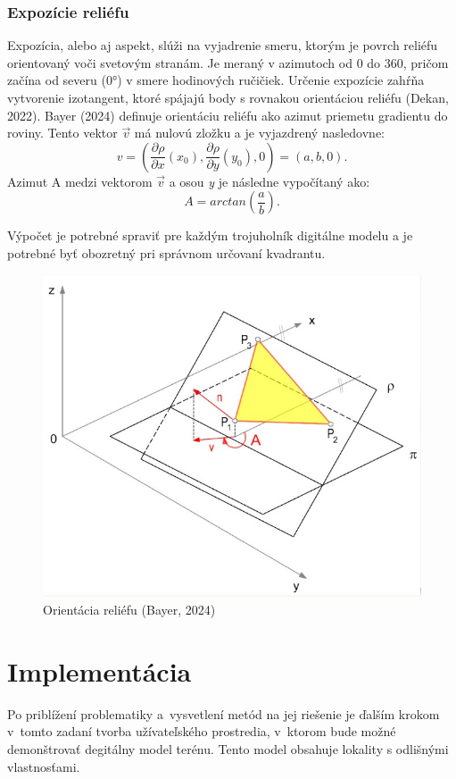 \documentclass[12pt]{article}
\begin{document}
\subsubsection*{Expozície reliéfu}
Expozícia, alebo aj aspekt, slúži na vyjadrenie smeru, ktorým je povrch reliéfu orientovaný voči svetovým stranám. Je meraný v azimutoch od 0 do 360, pričom začína od severu (0°) v smere hodinových ručičiek. Určenie expozície zahŕňa vytvorenie izotangent, ktoré spájajú body s rovnakou orientáciou reliéfu (Dekan, 2022).
Bayer (2024) definuje orientáciu reliéfu ako azimut priemetu gradientu do roviny. Tento vektor $\vec{v}$ má nulovú zložku a je vyjazdrený nasledovne:
$$v = (\frac{\partial \rho }{ \partial x}(x_0), \frac{\partial \rho }{ \partial y}(y_0),0)=(a, b, 0).$$
Azimut A medzi vektorom $\vec{v}$ a osou \textit{y} je následne vypočítaný ako:
$$ A = arctan (\frac{a}{b}). $$ \par
Výpočet je potrebné spraviť pre každým trojuholník digitálne modelu a je potrebné byť obozretný pri správnom určovaní kvadrantu.
\newpage

\begin{figure}[h]
    \centering
    \includegraphics[width=0.8\linewidth]{latex/images/aspekt.jpg}
    \caption{Orientácia reliéfu (Bayer, 2024)}
    \label{fig:enter-label}
\end{figure}

\clearpage 
\section*{Implementácia}
Po priblížení problematiky a vysvetlení metód na jej riešenie je ďalším krokom v tomto zadaní tvorba užívateľského prostredia, v ktorom bude možné demonštrovať  degitálny model terénu. Tento model obsahuje lokality s odlišnými vlastnosťami.
\end{document}
